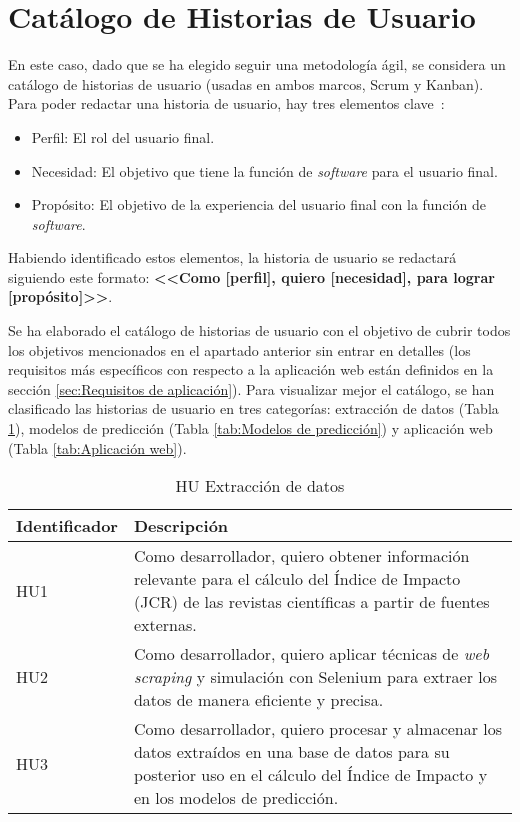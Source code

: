 \section{Catálogo de Historias de Usuario}
\label{sec:Catálogo de requisitos}

En este caso, dado que se ha elegido seguir una metodología ágil, se considera un catálogo de historias de usuario (usadas en ambos marcos, Scrum y Kanban). Para poder redactar una historia de usuario, hay tres elementos clave~\cite{Asana_2022}:
\begin{itemize}
    \item Perfil: El rol del usuario final.
    \item Necesidad: El objetivo que tiene la función de \textit{software} para el usuario final.
    \item Propósito: El objetivo de la experiencia del usuario final con la función de \textit{software}.
\end{itemize}

Habiendo identificado estos elementos, la historia de usuario se redactará siguiendo este formato: \textbf{<<Como [perfil], quiero [necesidad], para lograr [propósito]>>}.

Se ha elaborado el catálogo de historias de usuario con el objetivo de cubrir todos los objetivos mencionados en el apartado anterior sin entrar en detalles (los requisitos más específicos con respecto a la aplicación web están definidos en la sección \ref{sec:Requisitos de aplicación}). Para visualizar mejor el catálogo, se han clasificado las historias de usuario en tres categorías: extracción de datos (Tabla \ref{tab:extracción_de_datos}), modelos de predicción  (Tabla \ref{tab:Modelos de predicción}) y aplicación web (Tabla \ref{tab:Aplicación web}).

\begin{table}[h]
\centering
\begin{tabular}{|p{3cm}|p{8cm}|}
\hline
\textbf{Identificador} & \textbf{Descripción} \\
\hline
HU1 & Como desarrollador, quiero obtener información relevante para el cálculo del Índice de Impacto (JCR) de las revistas científicas a partir de fuentes externas. \\
\hline
HU2 & Como desarrollador, quiero aplicar técnicas de \textit{web scraping} y simulación con Selenium para extraer los datos de manera eficiente y precisa. \\
\hline
HU3 & Como desarrollador, quiero procesar y almacenar los datos extraídos en una base de datos para su posterior uso en el cálculo del Índice de Impacto y en los modelos de predicción. \\
\hline
\end{tabular}
\caption{HU Extracción de datos}
\label{tab:extracción_de_datos}
\end{table}
\newpage

